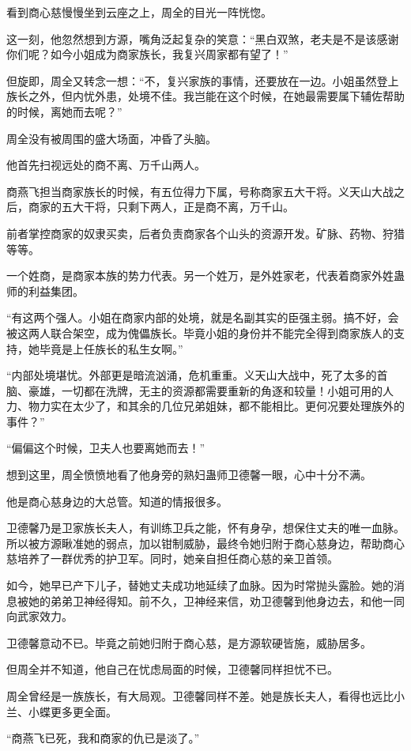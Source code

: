 \begin{this_body}
看到商心慈慢慢坐到云座之上，周全的目光一阵恍惚。

这一刻，他忽然想到方源，嘴角泛起复杂的笑意：“黑白双煞，老夫是不是该感谢你们呢？如今小姐成为商家族长，我复兴周家都有望了！”

但旋即，周全又转念一想：“不，复兴家族的事情，还要放在一边。小姐虽然登上族长之外，但内忧外患，处境不佳。我岂能在这个时候，在她最需要属下辅佐帮助的时候，离她而去呢？”

周全没有被周围的盛大场面，冲昏了头脑。

他首先扫视远处的商不离、万千山两人。

商燕飞担当商家族长的时候，有五位得力下属，号称商家五大干将。义天山大战之后，商家的五大干将，只剩下两人，正是商不离，万千山。

前者掌控商家的奴隶买卖，后者负责商家各个山头的资源开发。矿脉、药物、狩猎等等。

一个姓商，是商家本族的势力代表。另一个姓万，是外姓家老，代表着商家外姓蛊师的利益集团。

“有这两个强人。小姐在商家内部的处境，就是名副其实的臣强主弱。搞不好，会被这两人联合架空，成为傀儡族长。毕竟小姐的身份并不能完全得到商家族人的支持，她毕竟是上任族长的私生女啊。”

“内部处境堪忧。外部更是暗流汹涌，危机重重。义天山大战中，死了太多的首脑、豪雄，一切都在洗牌，无主的资源都需要重新的角逐和较量！小姐可用的人力、物力实在太少了，和其余的几位兄弟姐妹，都不能相比。更何况要处理族外的事件？”

“偏偏这个时候，卫夫人也要离她而去！”

想到这里，周全愤愤地看了他身旁的熟妇蛊师卫德馨一眼，心中十分不满。

他是商心慈身边的大总管。知道的情报很多。

卫德馨乃是卫家族长夫人，有训练卫兵之能，怀有身孕，想保住丈夫的唯一血脉。所以被方源瞅准她的弱点，加以钳制威胁，最终令她归附于商心慈身边，帮助商心慈培养了一群优秀的护卫军。同时，她亲自担任商心慈的亲卫首领。

如今，她早已产下儿子，替她丈夫成功地延续了血脉。因为时常抛头露脸。她的消息被她的弟弟卫神经得知。前不久，卫神经来信，劝卫德馨到他身边去，和他一同向武家效力。

卫德馨意动不已。毕竟之前她归附于商心慈，是方源软硬皆施，威胁居多。

但周全并不知道，他自己在忧虑局面的时候，卫德馨同样担忧不已。

周全曾经是一族族长，有大局观。卫德馨同样不差。她是族长夫人，看得也远比小兰、小蝶更多更全面。

“商燕飞已死，我和商家的仇已是淡了。”


\end{this_body}
